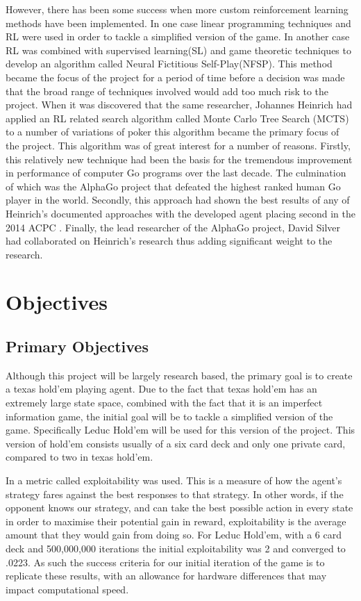 However, there has been some success when more custom reinforcement learning methods have been implemented.
In one case linear programming techniques and RL were used in order to tackle a
simplified version of the game\citep{dahl2001reinforcement}.
In another case RL was combined with supervised learning(SL) and game theoretic
techniques\citep{heinrich2016deep} to develop an algorithm called Neural Fictitious Self-Play(NFSP).
This method became the focus of the project for a period of time before a decision was made
that the broad range of techniques involved would add too much risk to the project.
When it was discovered that the same researcher, Johannes Heinrich had applied an RL related search
algorithm called Monte Carlo Tree Search (MCTS) to a number of variations of poker\citep{heinrich2015smooth}
this algorithm became the primary focus of the project.
This algorithm was of great interest for a number of reasons.
Firstly, this relatively new technique had been the basis for the tremendous improvement
in performance of computer Go programs over the last decade.
The culmination of which was the AlphaGo project that defeated the highest ranked human Go player
in the world\citep{silver2016mastering}.
Secondly, this approach had shown the best results of any of Heinrich's documented approaches
with the developed agent placing second in the 2014 ACPC .
Finally, the lead researcher of the AlphaGo project, David Silver had collaborated on Heinrich's
research thus adding significant weight to the research.


\section{Objectives}\label{sec:objectives}
\subsection{Primary Objectives}\label{subsec:primaryObjectives}

Although this project will be largely research based, the primary goal is to create a texas hold'em
playing agent.
Due to the fact that texas hold'em has an extremely large state space, combined with the fact that it
is an imperfect information game, the initial goal will be to tackle a simplified version of the game.
Specifically Leduc Hold'em will be used for this version of the project.
This version of hold'em consists usually of a six card deck and only one private card, compared to two in texas hold'em.

In\citep{heinrich2015smooth} a metric called exploitability was used.
This is a measure of how the agent's strategy fares against the best responses to that strategy.
In other words, if the opponent knows our strategy, and can take the best possible action
in every state in order to maximise their potential gain in reward, exploitability is the
average amount that they would gain from doing so.
For Leduc Hold'em, with a 6 card deck and 500,000,000 iterations the initial exploitability was 2 and converged
to .0223.
As such the success criteria for our initial iteration of the game is to replicate these results, with an
allowance for hardware differences that may impact computational speed.


